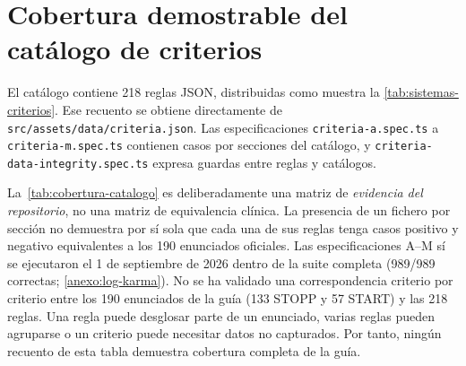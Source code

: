 \chapter{Cobertura demostrable del catálogo de criterios}
\label{anexo:cobertura-criterios}

El catálogo contiene 218 reglas JSON, distribuidas como muestra la
\cref{tab:sistemas-criterios}. Ese recuento se obtiene directamente de
\texttt{src/assets/data/criteria.json}. Las especificaciones
\texttt{criteria-a.spec.ts} a \texttt{criteria-m.spec.ts} contienen casos
por secciones del catálogo, y
\texttt{criteria-data-integrity.spec.ts} expresa guardas entre reglas y
catálogos.

La~\cref{tab:cobertura-catalogo} es deliberadamente una matriz de
\emph{evidencia del repositorio}, no una matriz de equivalencia clínica.
La presencia de un fichero por sección no demuestra por sí sola que
cada una de sus reglas tenga casos positivo y negativo equivalentes a
los 190 enunciados oficiales. Las especificaciones A--M sí se ejecutaron
el 1 de septiembre de 2026 dentro de la suite completa (989/989 correctas;
\cref{anexo:log-karma}). No se ha validado una correspondencia criterio
por criterio entre los 190 enunciados de la guía (133 STOPP y 57 START) y
las 218 reglas. Una regla
puede desglosar parte de un enunciado, varias reglas pueden agruparse o un
criterio puede necesitar datos no capturados. Por tanto, ningún recuento de
esta tabla demuestra cobertura completa de la guía.

